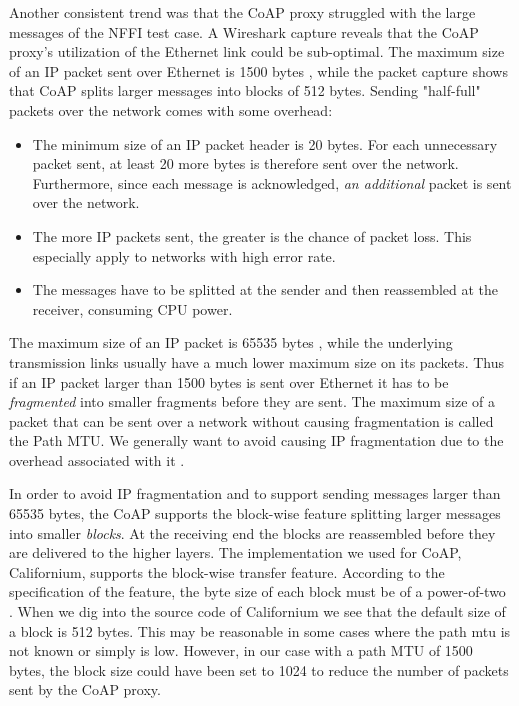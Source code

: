 Another consistent trend was that the CoAP proxy struggled with the large
messages of the NFFI test case. A Wireshark capture reveals that the CoAP
proxy's utilization of the Ethernet link could be sub-optimal. The maximum size
of an IP packet sent over Ethernet is 1500 bytes \cite{rfc-894}, while the
packet capture shows that CoAP splits larger messages into blocks of 512 bytes.
Sending "half-full" packets over the network comes with some overhead:

\begin{itemize}

    \item The minimum size of an IP packet header is 20 bytes. For each
    unnecessary packet sent, at least 20 more bytes is therefore sent over the
    network. Furthermore, since each message is acknowledged, \textit{an
    additional} packet is sent over the network.

    \item The more IP packets sent, the greater is the chance of packet loss.
    This especially apply to networks with high error rate.

    \item The messages have to be splitted at the sender and then reassembled at
    the receiver, consuming CPU power.

\end{itemize}

The maximum size of an IP packet is 65535 bytes \cite{rfc-791}, while the underlying
transmission links usually have a much lower maximum size on its packets. Thus if
an IP packet larger than 1500 bytes is sent over Ethernet it has to be
\textit{fragmented} into smaller fragments before they are sent. The maximum
size of a packet that can be sent over a network without causing fragmentation
is called the Path MTU. We generally want to avoid causing IP fragmentation due
to the overhead associated with it \cite{genkov2006avoiding}.

In order to avoid IP fragmentation and to support sending messages larger than
65535 bytes, the CoAP supports the block-wise feature splitting larger messages
into smaller \textit{blocks}. At the receiving end the blocks are reassembled
before they are delivered to the higher layers. The implementation we used for
CoAP, Californium, supports the block-wise transfer feature. According to the
specification of the feature, the byte size of each block must be of a
power-of-two \cite{draft-coap-blockwise}. When we dig into the source code of
Californium we see that the default size of a block is 512 bytes. This may be
reasonable in some cases where the path \gls{mtu} is not known or simply is low.
However, in our case with a path MTU of 1500 bytes, the block size could have
been set to 1024 to reduce the number of packets sent by the CoAP proxy.

